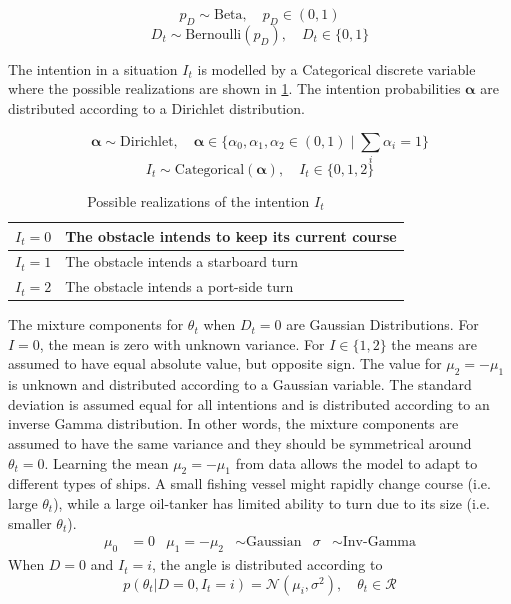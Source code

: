 \begin{equation}
    p_D \sim \text{Beta}, \quad p_D \in (0, 1)
\end{equation}
\begin{equation}
    D_t \sim \text{Bernoulli}(p_D), \quad D_t \in \{0, 1\}
\end{equation}

The intention in a situation $I_t$ is modelled by a Categorical discrete variable where the possible realizations are shown in \cref{tbl:intentions}. The intention probabilities $\boldsymbol{\alpha}$ are distributed according to a Dirichlet distribution.

\begin{equation}
    \boldsymbol{\alpha} \sim \text{Dirichlet}, \quad \boldsymbol{\alpha} \in \{\alpha_0, \alpha_1, \alpha_2 \in (0, 1) \; | \; \sum_i \alpha_i = 1 \}
\end{equation}
\begin{equation}
    I_t \sim \text{Categorical}(\boldsymbol{\alpha}), \quad I_t \in \{0, 1, 2\}
\end{equation}

\begin{table}[h]
\centering
\begin{tabular}{|l|l|}
\hline
$I_t=0$ & The obstacle intends to keep its current course \\ \hline
$I_t=1$ & The obstacle intends a starboard turn           \\ \hline
$I_t=2$ & The obstacle intends a port-side turn            \\ \hline
\end{tabular}
\caption{Possible realizations of the intention $I_t$}
\label{tbl:intentions}
\end{table}


The mixture components for $\theta_t$ when $D_t=0$ are Gaussian Distributions. For $I=0$, the mean is zero with unknown variance. For $I \in \{1, 2\}$ the means are assumed to have equal absolute value, but opposite sign. The value for $\mu_2 = -\mu_1$ is unknown and distributed according to a Gaussian variable. The standard deviation is assumed equal for all intentions and is distributed according to an inverse Gamma distribution. In other words, the mixture components are assumed to have the same variance and they should be symmetrical around $\theta_t=0$.
Learning the mean $\mu_2 = -\mu_1$ from data allows the model to adapt to different types of ships. A small fishing vessel might rapidly change course (i.e. large $\theta_t$), while a large oil-tanker has limited ability to turn due to its size (i.e. smaller $\theta_t$). 
\begin{align}
    \mu_0 &= 0 &  \mu_{1} = - \mu_{2} &\sim \text{Gaussian} & \sigma &\sim \text{Inv-Gamma}
\end{align}
When $D=0$ and $I_t=i$, the angle is distributed according to
\begin{equation}\label{eq:theta_intention_mixture}
    p(\theta_t | D=0, I_t=i) = \mathcal{N}(\mu_i, \sigma^2), \quad \theta_t \in \mathcal{R}
\end{equation}

